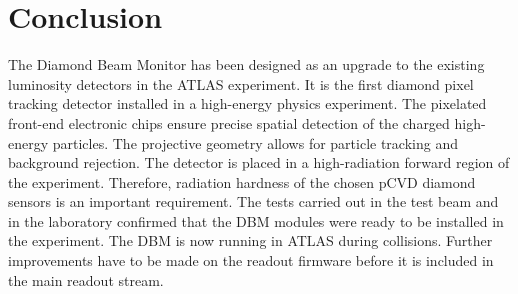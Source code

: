 \documentclass[12pt]{packages/mytustyle}  %
\begin{document}
\section{Conclusion}
\label{sec:limitations}
The Diamond Beam Monitor has been designed as an upgrade to the existing luminosity detectors in the ATLAS experiment. It is the first diamond pixel tracking detector installed in a high-energy physics experiment. The pixelated front-end electronic chips ensure precise spatial detection of the charged high-energy particles. The projective geometry allows for particle tracking and background rejection. The detector is placed in a high-radiation forward region of the experiment. Therefore, radiation hardness of the chosen pCVD diamond sensors is an important requirement. The tests carried out in the test beam and in the laboratory confirmed that the DBM modules were ready to be installed in the experiment. The DBM is now running in ATLAS during collisions. Further improvements have to be made on the readout firmware before it is included in the main readout stream. 



{}



\end{document}

